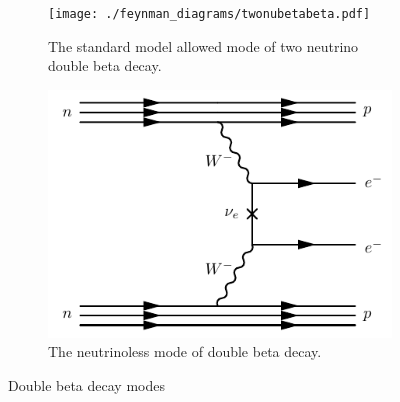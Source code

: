 \documentclass[herrin-thesis.tex]{subfiles}
\begin{document}
\begin{figure}
	\centering
	\begin{subfigure}[b]{0.48\textwidth}
		\centering
		\texttt{[image: ./feynman\_diagrams/twonubetabeta.pdf]}
		\caption[Diagram of \(2\nu\beta\beta\)]{The standard model allowed mode of two neutrino double beta decay.}
		\label{fig:diagram_2nubb}
	\end{subfigure}\hfill%
         \begin{subfigure}[b]{0.48\textwidth}
		\centering
		\includegraphics[width=\textwidth]{./feynman_diagrams/zeronubetabeta.pdf}
		\caption[Diagram of \(0\nu\beta\beta\)]{The neutrinoless mode of double beta decay.}
		\label{fig:diagram_0nubb}
	\end{subfigure}
	\label{fig:diagrams}
	\caption[Double beta decay modes]{Double beta decay modes}
\end{figure}
\end{document}
